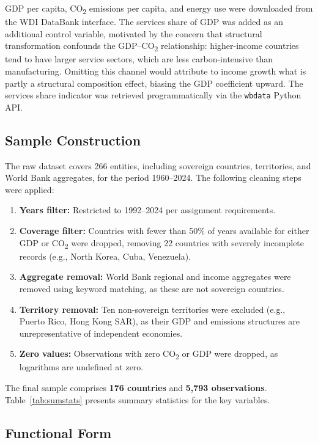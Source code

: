\documentclass[12pt, a4paper]{article}
\begin{document}
GDP per capita, CO\textsubscript{2} emissions per capita, and energy use were downloaded from the WDI DataBank interface. The services share of GDP was added as an additional control variable, motivated by the concern that structural transformation confounds the GDP--CO\textsubscript{2} relationship: higher-income countries tend to have larger service sectors, which are less carbon-intensive than manufacturing. Omitting this channel would attribute to income growth what is partly a structural composition effect, biasing the GDP coefficient upward. The services share indicator was retrieved programmatically via the \texttt{wbdata} Python API.

\subsection*{Sample Construction}

The raw dataset covers 266 entities, including sovereign countries, territories, and World Bank aggregates, for the period 1960--2024. The following cleaning steps were applied:

\begin{enumerate}
    \item \textbf{Years filter:} Restricted to 1992--2024 per assignment requirements.
    \item \textbf{Coverage filter:} Countries with fewer than 50\% of years available for either GDP or CO\textsubscript{2} were dropped, removing 22 countries with severely incomplete records (e.g., North Korea, Cuba, Venezuela).
    \item \textbf{Aggregate removal:} World Bank regional and income aggregates were removed using keyword matching, as these are not sovereign countries.
    \item \textbf{Territory removal:} Ten non-sovereign territories were excluded (e.g., Puerto Rico, Hong Kong SAR), as their GDP and emissions structures are unrepresentative of independent economies.
    \item \textbf{Zero values:} Observations with zero CO\textsubscript{2} or GDP were dropped, as logarithms are undefined at zero.
\end{enumerate}

The final sample comprises \textbf{176 countries} and \textbf{5,793 observations}. Table~\ref{tab:sumstats} presents summary statistics for the key variables.

\subsection*{Functional Form}
\end{document}

